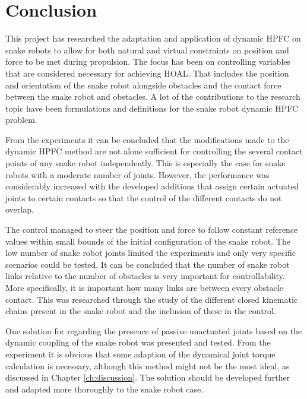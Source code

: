 \chapter{Conclusion}\label{ch:conclusion}

This project has researched the adaptation and application of dynamic HPFC on snake robots to allow for both natural and virtual constraints on position and force to be met during propulsion. The focus has been on controlling variables that are considered necessary for achieving HOAL. That includes the position and orientation of the snake robot alongside obstacles and the contact force between the snake robot and obstacles. A lot of the contributions to the research topic have been formulations and definitions for the snake robot dynamic HPFC problem.

From the experiments it can be concluded that the modifications made to the dynamic HPFC method are not alone sufficient for controlling the several contact points of any snake robot independently. This is especially the case for snake robots with a moderate number of joints. However, the performance was considerably increased with the developed additions that assign certain actuated joints to certain contacts so that the control of the different contacts do not overlap.


The control managed to steer the position and force to follow constant reference values within small bounds of the initial configuration of the snake robot. The low number of snake robot joints limited the experiments and only very specific scenarios could be tested. It can be concluded that the number of snake robot links relative to the number of obstacles is very important for controllability. More specifically, it is important how many links are between every  obstacle contact. This was researched through the study of the different closed kinematic chains present in the snake robot and the inclusion of these in the control.

One solution for regarding the presence of passive unactuated joints based on the dynamic coupling of the snake robot was presented and tested. From the experiment it is obvious that some adaption of the dynamical joint torque calculation is necessary, although this method might not be the most ideal, as discussed in Chapter \ref{ch:discussion}. The solution should be developed further and adapted more thoroughly to the snake robot case.

